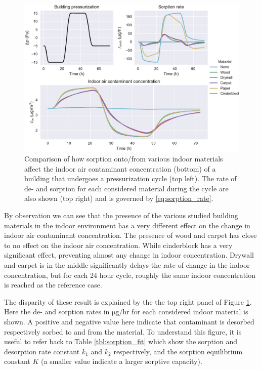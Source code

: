 \begin{figure}[!htb]
  \includegraphics[width=\textwidth]{sorption_indoor_cycle.pdf}
  \caption{
  Comparison of how sorption onto/from various indoor materials affect the indoor air contaminant concentration (bottom) of a building that undergoes a pressurization cycle (top left). The rate of de- and sorption for each considered material during the cycle are also shown (top right) and is governed by \eqref{eq:sorption_rate}.}
  \label{fig:indoor_sorption_cycle}
\end{figure}

By observation we can see that the presence of the various studied building materials in the indoor environment has a very different effect on the change in indoor air contaminant concentration.
The presence of wood and carpet has close to no effect on the indoor air concentration.
While cinderblock has a very significant effect, preventing almost any change in indoor concentration.
Drywall and carpet is in the middle significantly delays the rate of change in the indoor concentration, but for each 24 hour cycle, roughly the same indoor concentration is reached as the reference case.\par

The disparity of these result is explained by the the top right panel of Figure \ref{fig:indoor_sorption_cycle}.
Here the de- and sorption rates in $\mathrm{\mu g/hr}$ for each considered indoor material is shown.
A positive and negative value here indicate that contaminant is desorbed respectively sorbed to and from the material.
To understand this figure, it is useful to refer back to Table \ref{tbl:sorption_fit} which show the sorption and desorption rate constant $k_1$ and $k_2$ respectively, and the sorption equilibrium constant $K$ (a smaller value indicate a larger sorptive capacity).\par

